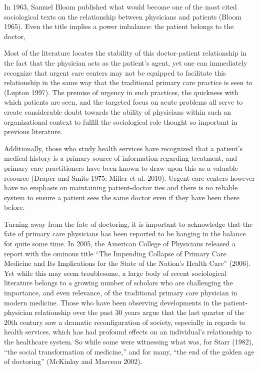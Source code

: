 \documentclass[12pt,twoside]{reedthesis}
\begin{document}
  In 1963, Samuel Bloom published what would become one of the most cited
  sociological texts on the relationship between physicians and patients
  (Bloom 1965). Even the title implies a power imbalance: the patient
  belongs to the doctor,
  
  Most of the literature locates the stability of this doctor-patient
  relationship in the fact that the physician acts as the patient's agent,
  yet one can immediately recognize that urgent care centers may not be
  equipped to facilitate this relationship in the same way that the
  traditional primary care practice is seen to (Lupton 1997). The premise
  of urgency in such practices, the quickness with which patients are
  seen, and the targeted focus on acute problems all serve to create
  considerable doubt towards the ability of physicians within such an
  organizational context to fulfill the sociological role thought so
  important in previous literature.
  
  Additionally, those who study health services have recognized that a
  patient's medical history is a primary source of information regarding
  treatment, and primary care practitioners have been known to draw upon
  this as a valuable resource (Draper and Smits 1975; Miller et al. 2010).
  Urgent care centers however have no emphasis on maintaining
  patient-doctor ties and there is no reliable system to ensure a patient
  sees the same doctor even if they have been there before.
  
  Turning away from the fate of doctoring, it is important to acknowledge
  that the fate of primary care physicians has been reported to be hanging
  in the balance for quite some time. In 2005, the American College of
  Physicians released a report with the ominous title ``The Impending
  Collapse of Primary Care Medicine and Its Implications for the State of
  the Nation's Health Care'' (2006). Yet while this may seem troublesome,
  a large body of recent sociological literature belongs to a growing
  number of scholars who are challenging the importance, and even
  relevance, of the traditional primary care physician in modern medicine.
  Those who have been observing developments in the patient-physician
  relationship over the past 30 years argue that the last quarter of the
  20th century saw a dramatic reconfiguration of society, especially in
  regards to health services, which has had profound effects on an
  individual's relationship to the healthcare system. So while some were
  witnessing what was, for Starr (1982), ``the social transformation of
  medicine,'' and for many, ``the end of the golden age of doctoring''
  (McKinlay and Marceau 2002).
  
\end{document}
